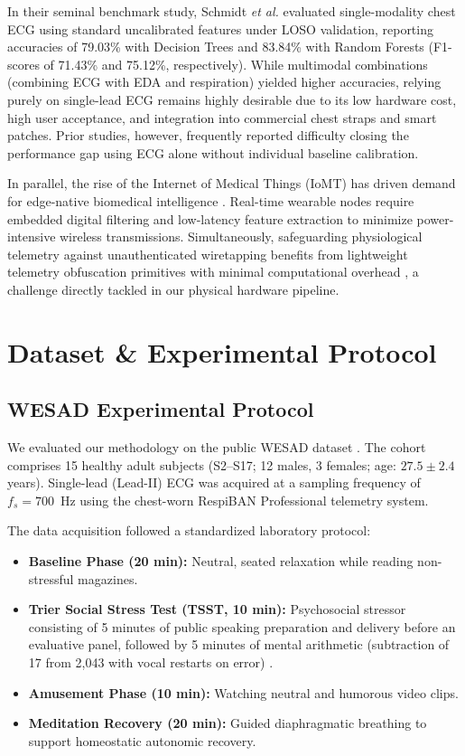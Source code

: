\documentclass[conference]{IEEEtran}
\begin{document}
In their seminal benchmark study, Schmidt \textit{et al.} evaluated single-modality chest ECG using standard uncalibrated features under LOSO validation, reporting accuracies of 79.03\% with Decision Trees and 83.84\% with Random Forests (F1-scores of 71.43\% and 75.12\%, respectively). While multimodal combinations (combining ECG with EDA and respiration) yielded higher accuracies, relying purely on single-lead ECG remains highly desirable due to its low hardware cost, high user acceptance, and integration into commercial chest straps and smart patches. Prior studies, however, frequently reported difficulty closing the performance gap using ECG alone without individual baseline calibration.

In parallel, the rise of the Internet of Medical Things (IoMT) has driven demand for edge-native biomedical intelligence \cite{alturjman2020iomt}. Real-time wearable nodes require embedded digital filtering \cite{oppenheim1999discrete, elgendi2013fast} and low-latency feature extraction to minimize power-intensive wireless transmissions. Simultaneously, safeguarding physiological telemetry against unauthenticated wiretapping benefits from lightweight telemetry obfuscation primitives with minimal computational overhead \cite{marsaglia2003xorshift}, a challenge directly tackled in our physical hardware pipeline.

\section{Dataset \& Experimental Protocol}
\subsection{WESAD Experimental Protocol}
We evaluated our methodology on the public WESAD dataset \cite{schmidt2018wesad}. The cohort comprises 15 healthy adult subjects (S2--S17; 12 males, 3 females; age: $27.5 \pm 2.4$ years). Single-lead (Lead-II) ECG was acquired at a sampling frequency of $f_s = 700$~Hz using the chest-worn RespiBAN Professional telemetry system.

The data acquisition followed a standardized laboratory protocol:
\begin{itemize}
    \item \textbf{Baseline Phase (20 min):} Neutral, seated relaxation while reading non-stressful magazines.
    \item \textbf{Trier Social Stress Test (TSST, 10 min):} Psychosocial stressor consisting of 5 minutes of public speaking preparation and delivery before an evaluative panel, followed by 5 minutes of mental arithmetic (subtraction of 17 from 2,043 with vocal restarts on error) \cite{kirschbaum1993trier}.
    \item \textbf{Amusement Phase (10 min):} Watching neutral and humorous video clips.
    \item \textbf{Meditation Recovery (20 min):} Guided diaphragmatic breathing to support homeostatic autonomic recovery.
\end{itemize}
\end{document}
